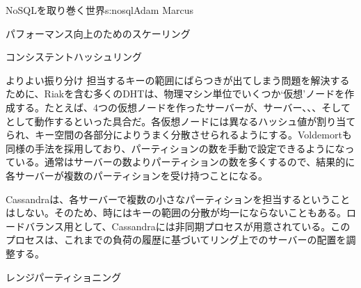 \begin{aosachapter}{NoSQLを取り巻く世界}{s:nosql}{Adam Marcus}
\begin{aosasect1}{パフォーマンス向上のためのスケーリング}
\begin{aosasect2}{コンシステントハッシュリング}
\begin{aosasect3}{よりよい振り分け}
担当するキーの範囲にばらつきが出てしまう問題を解決するために、Riakを含む多くのDHTは、物理マシン単位でいくつか`仮想'ノードを作成する。たとえば、4つの仮想ノードを作ったサーバーが、サーバー、、、そしてとして動作するといった具合だ。各仮想ノードには異なるハッシュ値が割り当てられ、キー空間の各部分によりうまく分散させられるようにする。Voldemortも同様の手法を採用しており、パーティションの数を手動で設定できるようになっている。通常はサーバーの数よりパーティションの数を多くするので、結果的に各サーバーが複数のパーティションを受け持つことになる。

Cassandraは、各サーバーで複数の小さなパーティションを担当するということはしない。そのため、時にはキーの範囲の分散が均一にならないこともある。ロードバランス用として、Cassandraには非同期プロセスが用意されている。このプロセスは、これまでの負荷の履歴に基づいてリング上でのサーバーの配置を調整する。

\end{aosasect3}

\end{aosasect2}

\vspace{-0.2cm} %
\begin{aosasect2}{レンジパーティショニング}
\vspace{-0.1cm} %


\end{aosasect2}
\end{aosasect1}
\end{aosachapter}
